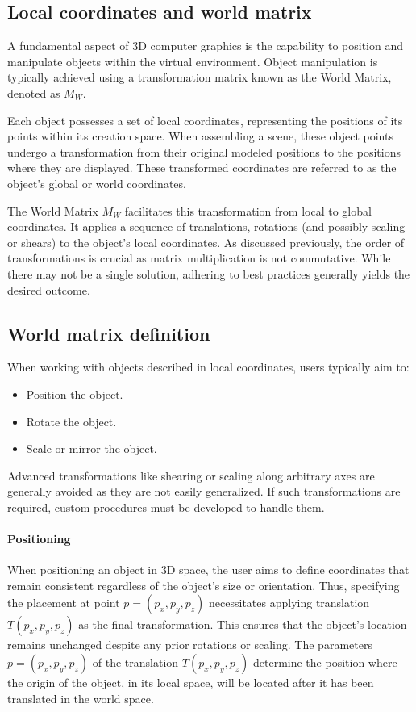 \subsection{Local coordinates and world matrix}
A fundamental aspect of 3D computer graphics is the capability to position and manipulate objects within the virtual environment. 
Object manipulation is typically achieved using a transformation matrix known as the World Matrix, denoted as $M_W$.

Each object possesses a set of local coordinates, representing the positions of its points within its creation space. 
When assembling a scene, these object points undergo a transformation from their original modeled positions to the positions where they are displayed. 
These transformed coordinates are referred to as the object's global or world coordinates.

The World Matrix $M_W$ facilitates this transformation from local to global coordinates. 
It applies a sequence of translations, rotations (and possibly scaling or shears) to the object's local coordinates. 
As discussed previously, the order of transformations is crucial as matrix multiplication is not commutative. 
While there may not be a single solution, adhering to best practices generally yields the desired outcome.

\subsection{World matrix definition}
When working with objects described in local coordinates, users typically aim to:
\begin{itemize}
    \item Position the object.
    \item Rotate the object.
    \item Scale or mirror the object.
\end{itemize}

Advanced transformations like shearing or scaling along arbitrary axes are generally avoided as they are not easily generalized. 
If such transformations are required, custom procedures must be developed to handle them.

\paragraph*{Positioning}
When positioning an object in 3D space, the user aims to define coordinates that remain consistent regardless of the object's size or orientation. 
Thus, specifying the placement at point $p=(p_x,p_y,p_z)$ necessitates applying translation $T(p_x,p_y,p_z)$ as the final transformation. 
This ensures that the object's location remains unchanged despite any prior rotations or scaling.
The parameters $p=(p_x,p_y,p_z)$ of the translation $T(p_x,p_y,p_z)$ determine the position where the origin of the object, in its local space, will be located after it has been translated in the world space.

